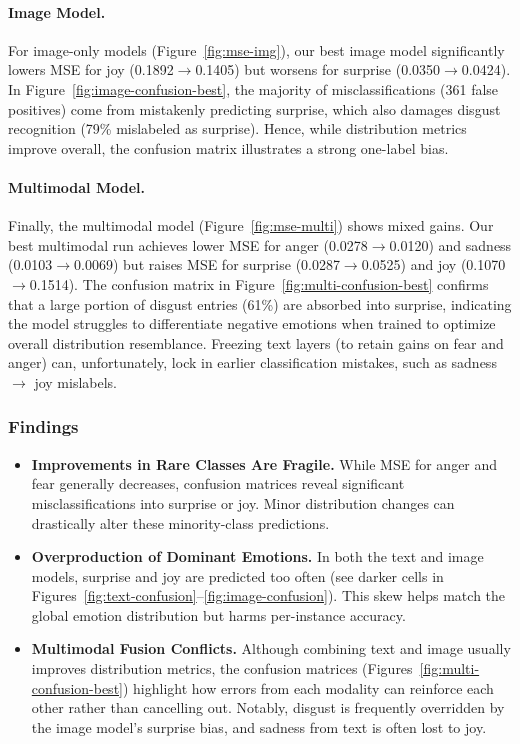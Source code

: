 \paragraph{Image Model.} 
For image-only models (Figure~\ref{fig:mse-img}), our best image model significantly lowers MSE for joy (0.1892$\rightarrow$0.1405) but worsens for surprise (0.0350$\rightarrow$0.0424). In Figure~\ref{fig:image-confusion-best}, the majority of misclassifications (361 false positives) come from mistakenly predicting surprise, which also damages disgust recognition (79\% mislabeled as surprise). Hence, while distribution metrics improve overall, the confusion matrix illustrates a strong one-label bias.

\paragraph{Multimodal Model.}
Finally, the multimodal model (Figure~\ref{fig:mse-multi}) shows mixed gains. Our best multimodal run achieves lower MSE for anger (0.0278$\rightarrow$0.0120) and sadness (0.0103$\rightarrow$0.0069) but raises MSE for surprise (0.0287$\rightarrow$0.0525) and joy (0.1070$\rightarrow$0.1514). The confusion matrix in Figure~\ref{fig:multi-confusion-best} confirms that a large portion of disgust entries (61\%) are absorbed into surprise, indicating the model struggles to differentiate negative emotions when trained to optimize overall distribution resemblance. Freezing text layers (to retain gains on fear and anger) can, unfortunately, lock in earlier classification mistakes, such as sadness $\rightarrow$ joy mislabels.

\subsubsection{Findings}

\begin{itemize}
    \item \textbf{Improvements in Rare Classes Are Fragile.} While MSE for anger and fear generally decreases, confusion matrices reveal significant misclassifications into surprise or joy. Minor distribution changes can drastically alter these minority-class predictions.
    
    \item \textbf{Overproduction of Dominant Emotions.} In both the text and image models, surprise and joy are predicted too often (see darker cells in Figures~\ref{fig:text-confusion}--\ref{fig:image-confusion}). This skew helps match the global emotion distribution but harms per-instance accuracy.
    
    \item \textbf{Multimodal Fusion Conflicts.} Although combining text and image usually improves distribution metrics, the confusion matrices (Figures~\ref{fig:multi-confusion-best}) highlight how errors from each modality can reinforce each other rather than cancelling out. Notably, disgust is frequently overridden by the image model’s surprise bias, and sadness from text is often lost to joy.
\end{itemize}

